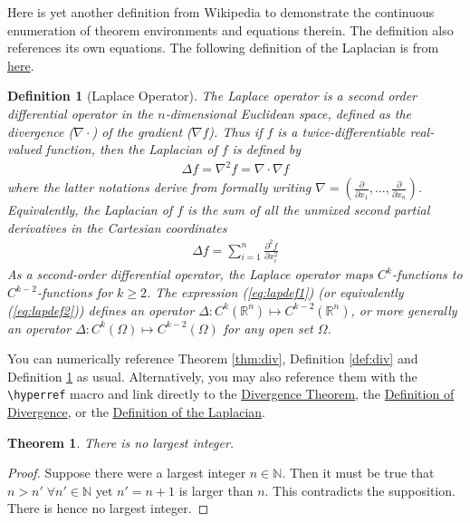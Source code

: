 \documentclass[10pt]{article}
\newtheorem{theorem}{Theorem}
\newtheorem{definition}{Definition}
\begin{document}
Here is yet another definition from Wikipedia to demonstrate the
continuous enumeration of theorem environments and equations
therein. The definition also references its own equations. The
following definition of the Laplacian is from
\href{http://en.wikipedia.org/wiki/Laplace_operator}{here}.
\begin{definition}[Laplace Operator]
  \label{def:lap}
  The Laplace operator is a second order differential operator in the
  $n$-dimensional Euclidean space, defined as the divergence
  ($\nabla\cdot$) of the gradient ($\nabla f$). Thus if $f$ is a
  twice-differentiable real-valued function, then the Laplacian of $f$
  is defined by
  \begin{align}
    \label{eq:lapdef1}
    \Delta f = \nabla^2f = \nabla\cdot\nabla f
  \end{align}
  where the latter notations derive from formally writing $\nabla =
  \left(\frac{\partial}{\partial x_1}, \ldots,
    \frac{\partial}{\partial x_n}\right)$. Equivalently, the Laplacian
  of $f$ is the sum of all the unmixed second partial derivatives in the
  Cartesian coordinates
  \begin{align}
    \label{eq:lapdef2}
    \Delta f = \sum_{i=1}^n \frac{\partial^2f}{\partial x_i^2}
  \end{align}
  As a second-order differential operator, the Laplace operator maps
  $C^k$-functions to $C^{k-2}$-functions for $k\geq 2$. The expression
  (\ref{eq:lapdef1}) (or equivalently (\ref{eq:lapdef2})) defines an
  operator $\Delta : C^k(\mathbb{R}^n) \mapsto
  C^{k-2}(\mathbb{R}^n)$, or more generally an operator $\Delta :
  C^k(\Omega) \mapsto C^{k-2}(\Omega)$ for any open set $\Omega$.
\end{definition}

You can numerically reference Theorem \ref{thm:div}, Definition
\ref{def:div} and Definition \ref{def:lap} as usual. Alternatively,
you may also reference them with the \texttt{\textbackslash{hyperref}}
macro and link directly to the \hyperref[thm:div]{Divergence Theorem},
the \hyperref[def:div]{Definition of Divergence}, or the
\hyperref[def:div]{Definition of the Laplacian}.

\begin{theorem}
  \label{thm:no_largest_int}
  There is no largest integer.
\end{theorem}
\begin{proof}
  Suppose there were a largest integer $n\in\mathbb{N}$. Then it must
  be true that $n > n'\;\forall n'\in\mathbb{N}$ yet $n' = n + 1$
  is larger than $n$. This contradicts the supposition. There is hence
  no largest integer.
\end{proof}
\end{document}

